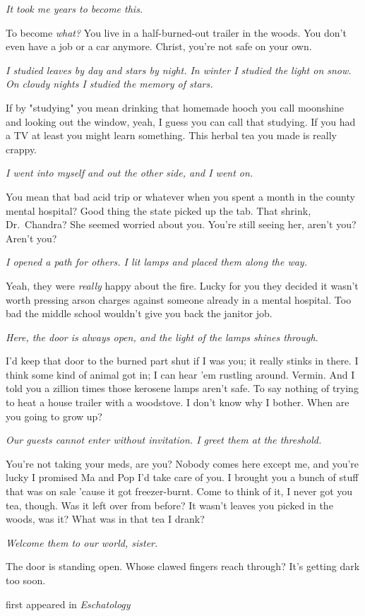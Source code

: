 \emph{It took me years to become this.}

To become \emph{what?} You live in a half-burned-out trailer in the
woods. You don't even have a job or a car anymore. Christ, you're not
safe on your own.

\emph{I studied leaves by day and stars by night. In winter I studied
the light on snow. On cloudy nights I studied the memory of stars.}

If by "studying" you mean drinking that homemade hooch you call
moonshine and looking out the window, yeah, I guess you can call that
studying. If you had a TV at least you might learn something. This
herbal tea you made is really crappy.

\emph{I went into myself and out the other side, and I went on.}

You mean that bad acid trip or whatever when you spent a month in the
county mental hospital? Good thing the state picked up the tab. That
shrink, Dr.~Chandra? She seemed worried about you. You're still seeing
her, aren't you? Aren't you?

\emph{I opened a path for others. I lit lamps and placed them along the
way.}

Yeah, they were \emph{really} happy about the fire. Lucky for you they
decided it wasn't worth pressing arson charges against someone already
in a mental hospital. Too bad the middle school wouldn't give you back
the janitor job.

\emph{Here, the door is always open, and the light of the lamps shines
through.}

I'd keep that door to the burned part shut if I was you; it really
stinks in there. I think some kind of animal got in; I can hear 'em
rustling around. Vermin. And I told you a zillion times those kerosene
lamps aren't safe. To say nothing of trying to heat a house trailer with
a woodstove. I don't know why I bother. When are you going to grow up?

\emph{Our guests cannot enter without invitation. I greet them at the
threshold.}

You're not taking your meds, are you? Nobody comes here except me, and
you're lucky I promised Ma and Pop I'd take care of you. I brought you a
bunch of stuff that was on sale 'cause it got freezer-burnt. Come to
think of it, I never got you tea, though. Was it left over from before?
It wasn't leaves you picked in the woods, was it? What was in that tea I
drank?

\emph{Welcome them to our world, sister.}

The door is standing open. Whose clawed fingers reach through? It's
getting dark too soon.

first appeared in \emph{Eschatology}
